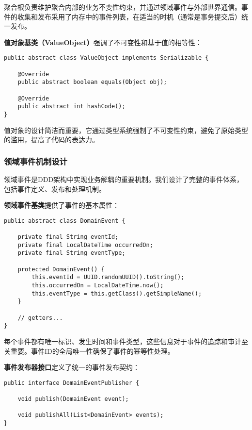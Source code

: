 \documentclass[a4paper,12pt]{article}
\begin{document}
聚合根负责维护聚合内部的业务不变性约束，并通过领域事件与外部世界通信。事件的收集和发布采用了内存中的事件列表，在适当的时机（通常是事务提交后）统一发布。

\textbf{值对象基类（ValueObject）}强调了不可变性和基于值的相等性：

\begin{lstlisting}[caption=ValueObject基类设计]
public abstract class ValueObject implements Serializable {
    
    @Override
    public abstract boolean equals(Object obj);
    
    @Override
    public abstract int hashCode();
}
\end{lstlisting}

值对象的设计简洁而重要，它通过类型系统强制了不可变性约束，避免了原始类型的滥用，提高了代码的表达力。

\subsubsection{领域事件机制设计}

领域事件是DDD架构中实现业务解耦的重要机制。我们设计了完整的事件体系，包括事件定义、发布和处理机制。

\textbf{领域事件基类}提供了事件的基本属性：

\begin{lstlisting}[caption=DomainEvent基类]
public abstract class DomainEvent {
    
    private final String eventId;
    private final LocalDateTime occurredOn;
    private final String eventType;
    
    protected DomainEvent() {
        this.eventId = UUID.randomUUID().toString();
        this.occurredOn = LocalDateTime.now();
        this.eventType = this.getClass().getSimpleName();
    }
    
    // getters...
}
\end{lstlisting}

每个事件都有唯一标识、发生时间和事件类型，这些信息对于事件的追踪和审计至关重要。事件ID的全局唯一性确保了事件的幂等性处理。

\textbf{事件发布器接口}定义了统一的事件发布契约：

\begin{lstlisting}[caption=DomainEventPublisher接口]
public interface DomainEventPublisher {
    
    void publish(DomainEvent event);
    
    void publishAll(List<DomainEvent> events);
}
\end{lstlisting}
\end{document}
